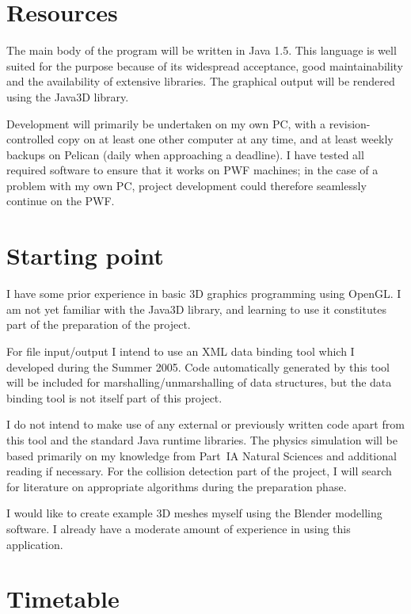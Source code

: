 \section*{Resources}

The main body of the program will be written in Java 1.5. This
language is well suited for the purpose because of its widespread
acceptance, good maintainability and the availability of extensive
libraries. The graphical output will be rendered using the Java3D
library.

Development will primarily be undertaken on my own PC, with a
revision-controlled copy on at least one other computer at any time,
and at least weekly backups on Pelican (daily when approaching a
deadline). I have tested all required software to ensure that it works
on PWF machines; in the case of a problem with my own PC, project
development could therefore seamlessly continue on the PWF.


\section*{Starting point}

I have some prior experience in basic 3D graphics programming using
OpenGL. I am not yet familiar with the Java3D library, and learning to
use it constitutes part of the preparation of the project.

For file input/output I intend to use an XML data binding tool which
I developed during the Summer 2005. Code automatically generated by
this tool will be included for marshalling/unmarshalling of data
structures, but the data binding tool is not itself part of this
project.

I do not intend to make use of any external or previously written code
apart from this tool and the standard Java runtime libraries.
The physics simulation will be based primarily on my knowledge from
Part~IA Natural Sciences and additional reading if necessary. For the
collision detection part of the project, I will search for literature
on appropriate algorithms during the preparation phase.

I would like to create example 3D meshes myself using the Blender
modelling software. I already have a moderate amount of experience
in using this application.


\section*{Timetable}

